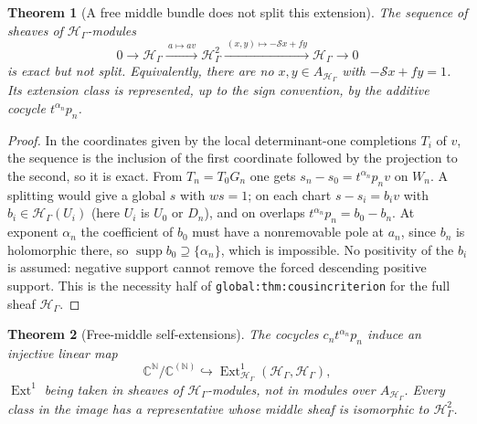 \documentclass[11pt,letterpaper]{article}
\newtheorem{theorem}{Theorem}[section]
\theoremstyle{definition}
\theoremstyle{remark}
\newcommand{\C}{\mathbb C}
\newcommand{\N}{\mathbb N}
\newcommand{\HH}{\mathscr H_\Gamma}
\newcommand{\supp}{\operatorname{supp}}
\newcommand{\Ext}{\operatorname{Ext}}
\numberwithin{equation}{section}
\begin{document}
\begin{theorem}[A free middle bundle does not split this extension]
\label{nab:pl:thm:extension}
The sequence of sheaves of $\HH$-modules
\begin{equation}\label{nab:pl:eq:extension}
 0\longrightarrow\HH\xrightarrow{\ a\mapsto av\ }\HH^{2}
 \xrightarrow{\ (x,y)\mapsto-\mathcal Sx+fy\ }\HH\longrightarrow0
\end{equation}
is exact but not split. Equivalently, there are no $x,y\in A_{\HH}$ with
$-\mathcal Sx+fy=1$. Its extension class is represented, up to the sign
convention, by the additive cocycle $t^{\alpha_n}p_n$.
\end{theorem}

\begin{proof}
In the coordinates given by the local determinant-one completions $T_i$ of
$v$, the sequence is the inclusion of the first coordinate followed by the
projection to the second, so it is exact. From $T_n=T_0G_n$ one gets
$s_n-s_0=t^{\alpha_n}p_nv$ on $W_n$. A splitting would give a global $s$ with
$ws=1$; on each chart $s-s_i=b_iv$ with $b_i\in\HH(U_i)$ (here $U_i$ is $U_0$
or $D_n$), and on overlaps $t^{\alpha_n}p_n=b_0-b_n$. At exponent $\alpha_n$
the coefficient of $b_0$ must have a nonremovable pole at $a_n$, since $b_n$ is
holomorphic there, so $\supp b_0\supseteq\{\alpha_n\}$, which is impossible.
No positivity of the $b_i$ is assumed: negative support cannot remove the
forced descending positive support. This is the necessity half of
\nolinkurl{global:thm:cousincriterion} for the full sheaf $\HH$.
\end{proof}

\begin{theorem}[Free-middle self-extensions]\label{nab:pl:thm:extension-space}
The cocycles $c_nt^{\alpha_n}p_n$ induce an injective linear map
\begin{equation}\label{nab:pl:eq:extspace}
 \C^{\N}/\C^{(\N)}\hookrightarrow\Ext^1_{\HH}(\HH,\HH),
\end{equation}
$\Ext^1$ being taken in sheaves of $\HH$-modules, not in modules over
$A_{\HH}$. Every class in the image has a representative whose middle sheaf is
isomorphic to $\HH^2$.
\end{theorem}
\end{document}
